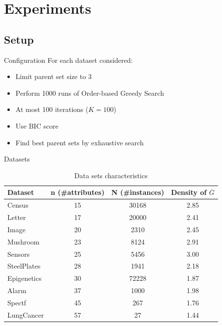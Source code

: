 \section{Experiments}

\subsection{Setup}
	\begin{frame}{Configuration}
		For each dataset considered:
		\begin{itemize}
			\item Limit parent set size to 3
			\item Perform 1000 runs of Order-based Greedy Search
			\item At most 100 iterations ($K = 100$)
			\item Use BIC score
			\item Find best parent sets by exhaustive search
		\end{itemize}
	\end{frame}
	\begin{frame}{Datasets}
		\begin{table}
			\centering
			\begin{tabular}{ | l | c | c | c | }
				\hline
				Dataset & n (\#attributes) & N (\#instances) & Density of $\overline G$ \\ \hline
				Census & 15 & 30168 & 2.85 \\ \hline
				Letter & 17 & 20000 & 2.41 \\ \hline
				Image & 20 & 2310 & 2.45 \\ \hline
				Mushroom & 23 & 8124 & 2.91 \\ \hline
				Sensors & 25 & 5456 & 3.00 \\ \hline
				SteelPlates & 28 & 1941 & 2.18 \\ \hline
				Epigenetics & 30 & 72228 & 1.87 \\ \hline
				Alarm & 37 & 1000 & 1.98 \\ \hline
				Spectf & 45 & 267 & 1.76 \\ \hline
				LungCancer & 57 & 27 & 1.44 \\ \hline
			\end{tabular}
			\caption{Data sets characteristics}
			\label{tab:datasets}
		\end{table}
	\end{frame}
	
